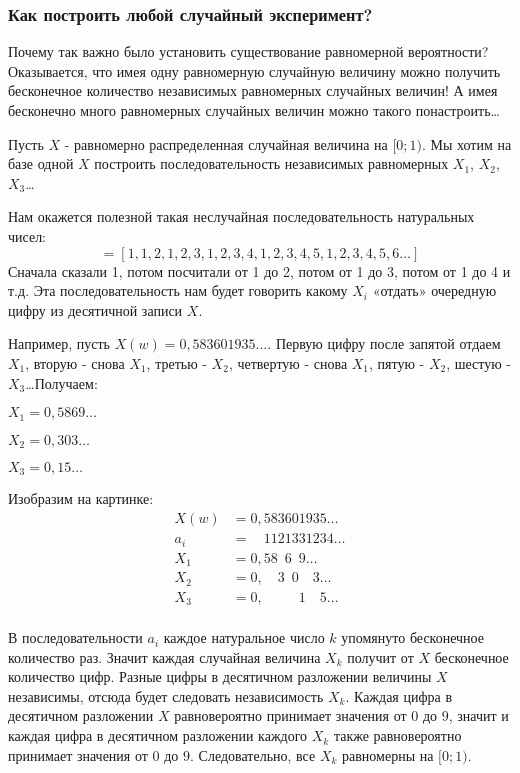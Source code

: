 \documentclass[pdftex, 12pt, a4paper]{article}
\theoremstyle{definition} %
\numberwithin{problem}{section}
\numberwithin{blits}{section}
\begin{document}
\subsubsection*{Как построить любой случайный эксперимент?}

Почему так важно было установить существование равномерной вероятности? Оказывается, что имея одну равномерную случайную величину можно получить бесконечное количество независимых равномерных случайных величин! А имея бесконечно много равномерных случайных величин можно такого понастроить\ldots

Пусть $X$ - равномерно распределенная случайная величина на $[0;1)$. Мы хотим на базе одной $X$ построить последовательность независимых равномерных $X_{1}$, $X_{2}$, $X_{3}$\ldots

Нам окажется полезной такая неслучайная последовательность натуральных чисел:
\begin{equation}
[a_{i}]=[1,1,2,1,2,3,1,2,3,4,1,2,3,4,5,1,2,3,4,5,6\ldots ]
\end{equation}
Сначала сказали 1, потом посчитали от 1 до 2, потом от 1 до 3, потом от 1 до 4 и т.д. Эта последовательность нам будет говорить какому $X_{i}$ «отдать» очередную цифру из десятичной записи $X$.

Например, пусть $X(w)=0,583601935\ldots $. Первую цифру после запятой отдаем $X_{1}$, вторую - снова $X_{1}$, третью - $X_{2}$, четвертую - снова $X_{1}$, пятую - $X_{2}$, шестую - $X_{3}$\ldots  Получаем:

$X_{1}=0,5869\ldots $

$X_{2}=0,303\ldots $

$X_{3}=0,15\ldots $

Изобразим на картинке:
\begin{align*}
X(w) &=0,583601935\ldots \\
a_{i} &=\phantom{0,}1121331234\ldots \\
X_{1}&=0,58\phantom{0}6\phantom{0}9\ldots \\
X_{2}&=0,\phantom{00}3\phantom{0}0\phantom{00}3\ldots \\
X_{3}&=0,\phantom{00000}1\phantom{00}5\ldots \\
\end{align*}



В последовательности $a_{i}$ каждое натуральное число $k$ упомянуто бесконечное количество раз. Значит каждая случайная величина  $X_{k}$ получит от $X$ бесконечное количество цифр. Разные цифры в десятичном разложении величины $X$ независимы, отсюда будет следовать независимость $X_{k}$. Каждая цифра в десятичном разложении $X$ равновероятно принимает значения от $0$ до $9$, значит и каждая цифра в десятичном разложении каждого $X_{k}$ также равновероятно принимает значения от $0$ до $9$. Следовательно, все $X_{k}$ равномерны на $[0;1)$.
\end{document}
